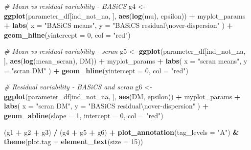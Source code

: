 \documentclass[9pt,a4paper,]{extarticle}
\newenvironment{Shaded}{\begin{snugshade}}{\end{snugshade}}
\newcommand{\CharTok}[1]{\textcolor[rgb]{0.31,0.60,0.02}{#1}}
\newcommand{\CommentTok}[1]{\textcolor[rgb]{0.56,0.35,0.01}{\textit{#1}}}
\newcommand{\DataTypeTok}[1]{\textcolor[rgb]{0.13,0.29,0.53}{#1}}
\newcommand{\DecValTok}[1]{\textcolor[rgb]{0.00,0.00,0.81}{#1}}
\newcommand{\KeywordTok}[1]{\textcolor[rgb]{0.13,0.29,0.53}{\textbf{#1}}}
\newcommand{\NormalTok}[1]{#1}
\newcommand{\OperatorTok}[1]{\textcolor[rgb]{0.81,0.36,0.00}{\textbf{#1}}}
\newcommand{\StringTok}[1]{\textcolor[rgb]{0.31,0.60,0.02}{#1}}
\begin{document}
\begin{Shaded}
\begin{Highlighting}[]
\CommentTok{# Mean vs residual variability - BASiCS}
\NormalTok{g4 <-}\StringTok{ }\KeywordTok{ggplot}\NormalTok{(parameter_df[ind_not_na, ], }\KeywordTok{aes}\NormalTok{(}\KeywordTok{log}\NormalTok{(mu), epsilon)) }\OperatorTok{+}
\StringTok{  }\NormalTok{myplot_params }\OperatorTok{+}
\StringTok{  }\KeywordTok{labs}\NormalTok{(}
    \DataTypeTok{x =} \StringTok{"BASiCS means"}\NormalTok{,}
    \DataTypeTok{y =} \StringTok{"BASiCS residual}\CharTok{\textbackslash{}n}\StringTok{over-dispersion"}
\NormalTok{  ) }\OperatorTok{+}
\StringTok{  }\KeywordTok{geom_hline}\NormalTok{(}\DataTypeTok{yintercept =} \DecValTok{0}\NormalTok{, }\DataTypeTok{col =} \StringTok{"red"}\NormalTok{)}

\CommentTok{# Mean vs residual variability - scran}
\NormalTok{g5 <-}\StringTok{ }\KeywordTok{ggplot}\NormalTok{(parameter_df[ind_not_na, ], }\KeywordTok{aes}\NormalTok{(}\KeywordTok{log}\NormalTok{(mean_scran), DM)) }\OperatorTok{+}
\StringTok{  }\NormalTok{myplot_params }\OperatorTok{+}
\StringTok{  }\KeywordTok{labs}\NormalTok{(}
    \DataTypeTok{x =} \StringTok{"scran means"}\NormalTok{,}
    \DataTypeTok{y =} \StringTok{"scran DM"}
\NormalTok{  ) }\OperatorTok{+}
\StringTok{  }\KeywordTok{geom_hline}\NormalTok{(}\DataTypeTok{yintercept =} \DecValTok{0}\NormalTok{, }\DataTypeTok{col =} \StringTok{"red"}\NormalTok{)}

\CommentTok{# Residual variability - BASiCS and scran}
\NormalTok{g6 <-}\StringTok{ }\KeywordTok{ggplot}\NormalTok{(parameter_df[ind_not_na, ], }\KeywordTok{aes}\NormalTok{(DM, epsilon)) }\OperatorTok{+}
\StringTok{  }\NormalTok{myplot_params }\OperatorTok{+}
\StringTok{  }\KeywordTok{labs}\NormalTok{(}
    \DataTypeTok{x =} \StringTok{"scran DM"}\NormalTok{,}
    \DataTypeTok{y =} \StringTok{"BASiCS residual}\CharTok{\textbackslash{}n}\StringTok{over-dispersion"}
\NormalTok{  ) }\OperatorTok{+}
\StringTok{  }\KeywordTok{geom_abline}\NormalTok{(}\DataTypeTok{slope =} \DecValTok{1}\NormalTok{, }\DataTypeTok{intercept =} \DecValTok{0}\NormalTok{, }\DataTypeTok{col =} \StringTok{"red"}\NormalTok{)}

\NormalTok{(g1 }\OperatorTok{+}\StringTok{ }\NormalTok{g2 }\OperatorTok{+}\StringTok{ }\NormalTok{g3) }\OperatorTok{/}\StringTok{ }\NormalTok{(g4 }\OperatorTok{+}\StringTok{ }\NormalTok{g5 }\OperatorTok{+}\StringTok{ }\NormalTok{g6) }\OperatorTok{+}\StringTok{ }
\StringTok{  }\KeywordTok{plot_annotation}\NormalTok{(}\DataTypeTok{tag_levels =} \StringTok{"A"}\NormalTok{) }\OperatorTok{&}\StringTok{ }\KeywordTok{theme}\NormalTok{(}\DataTypeTok{plot.tag =} \KeywordTok{element_text}\NormalTok{(}\DataTypeTok{size =} \DecValTok{15}\NormalTok{))}
\end{Highlighting}
\end{Shaded}
\end{document}
